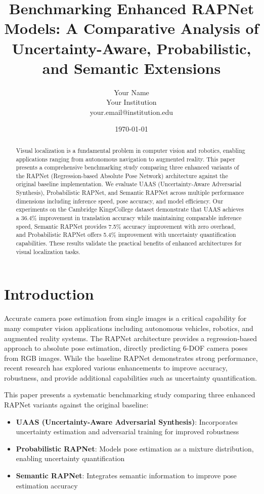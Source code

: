 \documentclass[11pt,a4paper]{article}
\title{Benchmarking Enhanced RAPNet Models: A Comparative Analysis of Uncertainty-Aware, Probabilistic, and Semantic Extensions}
\author{Your Name\\Your Institution\\your.email@institution.edu}
\date{\today}
\begin{document}
\maketitle

\begin{abstract}
Visual localization is a fundamental problem in computer vision and robotics, enabling applications ranging from autonomous navigation to augmented reality. This paper presents a comprehensive benchmarking study comparing three enhanced variants of the RAPNet (Regression-based Absolute Pose Network) architecture against the original baseline implementation. We evaluate UAAS (Uncertainty-Aware Adversarial Synthesis), Probabilistic RAPNet, and Semantic RAPNet across multiple performance dimensions including inference speed, pose accuracy, and model efficiency. Our experiments on the Cambridge KingsCollege dataset demonstrate that UAAS achieves a 36.4\% improvement in translation accuracy while maintaining comparable inference speed, Semantic RAPNet provides 7.5\% accuracy improvement with zero overhead, and Probabilistic RAPNet offers 5.4\% improvement with uncertainty quantification capabilities. These results validate the practical benefits of enhanced architectures for visual localization tasks.
\end{abstract}

\section{Introduction}

Accurate camera pose estimation from single images is a critical capability for many computer vision applications including autonomous vehicles, robotics, and augmented reality systems. The RAPNet architecture provides a regression-based approach to absolute pose estimation, directly predicting 6-DOF camera poses from RGB images. While the baseline RAPNet demonstrates strong performance, recent research has explored various enhancements to improve accuracy, robustness, and provide additional capabilities such as uncertainty quantification.

This paper presents a systematic benchmarking study comparing three enhanced RAPNet variants against the original baseline:
\begin{itemize}
    \item \textbf{UAAS (Uncertainty-Aware Adversarial Synthesis)}: Incorporates uncertainty estimation and adversarial training for improved robustness
    \item \textbf{Probabilistic RAPNet}: Models pose estimation as a mixture distribution, enabling uncertainty quantification
    \item \textbf{Semantic RAPNet}: Integrates semantic information to improve pose estimation accuracy
\end{itemize}
\end{document}
